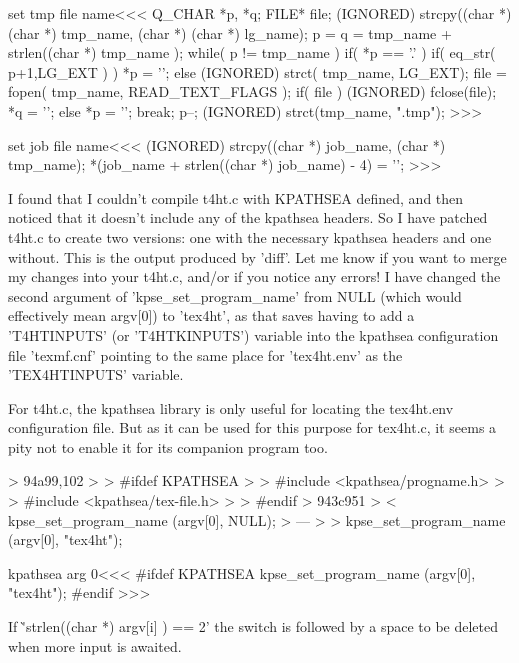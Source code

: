 {\<set tmp file name\><<<
{                                 Q_CHAR   *p, *q;
                                  FILE*    file;
   (IGNORED) strcpy((char *) (char *) tmp_name, (char *) (char *) lg_name);
   p = q = tmp_name + strlen((char *)  tmp_name );
   while( p != tmp_name ){
      if( *p == '.' ){
          if( eq_str( p+1,LG_EXT ) ) { *p = '\0'; }
          else {  
            (IGNORED) strct( tmp_name, LG_EXT);
            file =  fopen( tmp_name, READ_TEXT_FLAGS );
            if( file ){
              (IGNORED) fclose(file); *q = '\0';
            } else {  *p = '\0'; }
          } 
          break;
      }
      p--;
   }
   (IGNORED) strct(tmp_name, ".tmp");
}
>>>


\<set job file name\><<<
(IGNORED) strcpy((char *)  job_name, (char *) tmp_name); 
*(job_name + strlen((char *) job_name) - 4) = '\0';
>>>



\Verbatim
I found that I couldn't compile t4ht.c with KPATHSEA defined, and then noticed
that it doesn't include any of the kpathsea headers.  So I have patched t4ht.c
to create two versions:  one with the necessary kpathsea headers and one
without.  This is the output produced by 'diff'.  Let me know if you want to
merge my changes into your t4ht.c, and/or if you notice any errors!  I have
changed the second argument of 'kpse_set_program_name' from NULL (which would
effectively mean argv[0]) to 'tex4ht', as that saves having to add a
'T4HTINPUTS' (or 'T4HTKINPUTS') variable into the kpathsea configuration file
'texmf.cnf' pointing to the same place for 'tex4ht.env' as the 'TEX4HTINPUTS'
variable.

For t4ht.c, the kpathsea library is only useful for locating the tex4ht.env
configuration file.  But as it can be used for this purpose for tex4ht.c, it
seems a pity not to enable it for its companion program too.

> 94a99,102
> > #ifdef KPATHSEA
> > #include <kpathsea/progname.h>
> > #include <kpathsea/tex-file.h>
> > #endif
> 943c951
> <    kpse_set_program_name (argv[0], NULL);
> ---
> >    kpse_set_program_name (argv[0], "tex4ht");
\EndVerbatim

\<kpathsea arg 0\><<<
#ifdef KPATHSEA
   kpse_set_program_name (argv[0], "tex4ht");
#endif
>>>



If \`'strlen((char *)  argv[i] ) == 2' the switch is followed by a
space to be deleted when more input is awaited.


}
